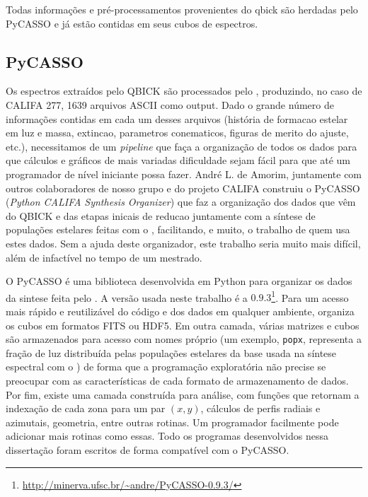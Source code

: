 Todas informações e pré-processamentos provenientes do {\sc qbick} são herdadas pelo PyCASSO e já estão contidas em seus
cubos de espectros.

\subsection{PyCASSO}

Os espectros extraídos pelo QBICK são processados pelo \starlight, produzindo, no caso de CALIFA 277, 1639 arquivos
ASCII como output. Dado o grande número de informações contidas em cada um desses arquivos (história de formacao estelar
em luz e massa, extincao, parametros conematicos, figuras de merito do ajuste, etc.), necessitamos de um {\em pipeline}
que faça a organização de todos os dados para que cálculos e gráficos de mais variadas dificuldade sejam fácil para que
até um programador de nível iniciante possa fazer. André L. de Amorim, juntamente com outros colaboradores de nosso
grupo e do projeto CALIFA construiu o PyCASSO ({\em Python CALIFA \starlight Synthesis Organizer}) \citep[][ cap.
4]{CidFernandes2013I} que faz a organização dos dados que vêm do QBICK e das etapas inicais de reducao juntamente com a
síntese de populações estelares feitas com o \starlight, facilitando, e muito, o trabalho de quem usa estes dados. Sem a
ajuda deste organizador, este trabalho seria muito mais difícil, além de infactível no tempo de um mestrado.

O PyCASSO é uma biblioteca desenvolvida em Python para organizar os dados da sintese feita pelo \starlight. A versão
usada neste trabalho é a $0.9.3$\footnote{\url{http://minerva.ufsc.br/~andre/PyCASSO-0.9.3/}}. Para um acesso mais
rápido e reutilizável do código e dos dados em qualquer ambiente, organiza os cubos em formatos FITS ou HDF5. Em outra
camada, várias matrizes e cubos são armazenados para acesso com nomes próprio (um exemplo, \texttt{popx}, representa a
fração de luz distribuída pelas populações estelares da base usada na síntese espectral com o \starlight) de forma que a
programação exploratória não precise se preocupar com as características de cada formato de armazenamento de dados. Por
fim, existe uma camada construída para análise, com funções que retornam a indexação de cada zona para um par $(x, y)$,
cálculos de perfis radiais e azimutais, geometria, entre outras rotinas. Um programador facilmente pode adicionar mais
rotinas como essas. Todo os programas desenvolvidos nessa dissertação foram escritos de forma compatível com o PyCASSO.

